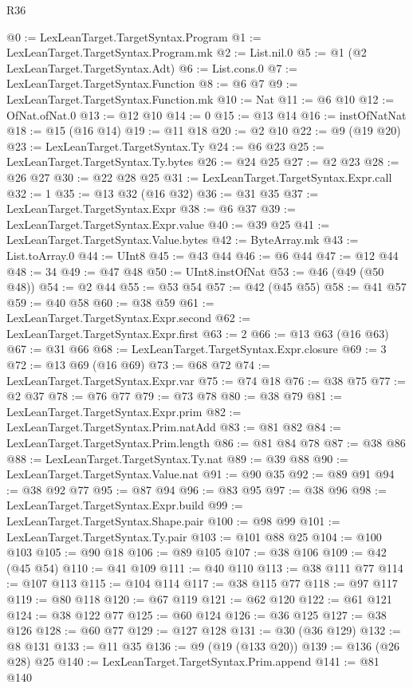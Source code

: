 \begin{lexlean}{R36}
\begin{coremodule}
@0 := LexLeanTarget.TargetSyntax.Program
@1 := LexLeanTarget.TargetSyntax.Program.mk
@2 := List.nil.{0}
@5 := @1 (@2 LexLeanTarget.TargetSyntax.Adt)
@6 := List.cons.{0}
@7 := LexLeanTarget.TargetSyntax.Function
@8 := @6 @7
@9 := LexLeanTarget.TargetSyntax.Function.mk
@10 := Nat
@11 := @6 @10
@12 := OfNat.ofNat.{0}
@13 := @12 @10
@14 := 0
@15 := @13 @14
@16 := instOfNatNat
@18 := @15 (@16 @14)
@19 := @11 @18
@20 := @2 @10
@22 := @9 (@19 @20)
@23 := LexLeanTarget.TargetSyntax.Ty
@24 := @6 @23
@25 := LexLeanTarget.TargetSyntax.Ty.bytes
@26 := @24 @25
@27 := @2 @23
@28 := @26 @27
@30 := @22 @28 @25
@31 := LexLeanTarget.TargetSyntax.Expr.call
@32 := 1
@35 := @13 @32 (@16 @32)
@36 := @31 @35
@37 := LexLeanTarget.TargetSyntax.Expr
@38 := @6 @37
@39 := LexLeanTarget.TargetSyntax.Expr.value
@40 := @39 @25
@41 := LexLeanTarget.TargetSyntax.Value.bytes
@42 := ByteArray.mk
@43 := List.toArray.{0}
@44 := UInt8
@45 := @43 @44
@46 := @6 @44
@47 := @12 @44
@48 := 34
@49 := @47 @48
@50 := UInt8.instOfNat
@53 := @46 (@49 (@50 @48))
@54 := @2 @44
@55 := @53 @54
@57 := @42 (@45 @55)
@58 := @41 @57
@59 := @40 @58
@60 := @38 @59
@61 := LexLeanTarget.TargetSyntax.Expr.second
@62 := LexLeanTarget.TargetSyntax.Expr.first
@63 := 2
@66 := @13 @63 (@16 @63)
@67 := @31 @66
@68 := LexLeanTarget.TargetSyntax.Expr.closure
@69 := 3
@72 := @13 @69 (@16 @69)
@73 := @68 @72
@74 := LexLeanTarget.TargetSyntax.Expr.var
@75 := @74 @18
@76 := @38 @75
@77 := @2 @37
@78 := @76 @77
@79 := @73 @78
@80 := @38 @79
@81 := LexLeanTarget.TargetSyntax.Expr.prim
@82 := LexLeanTarget.TargetSyntax.Prim.natAdd
@83 := @81 @82
@84 := LexLeanTarget.TargetSyntax.Prim.length
@86 := @81 @84 @78
@87 := @38 @86
@88 := LexLeanTarget.TargetSyntax.Ty.nat
@89 := @39 @88
@90 := LexLeanTarget.TargetSyntax.Value.nat
@91 := @90 @35
@92 := @89 @91
@94 := @38 @92 @77
@95 := @87 @94
@96 := @83 @95
@97 := @38 @96
@98 := LexLeanTarget.TargetSyntax.Expr.build
@99 := LexLeanTarget.TargetSyntax.Shape.pair
@100 := @98 @99
@101 := LexLeanTarget.TargetSyntax.Ty.pair
@103 := @101 @88 @25
@104 := @100 @103
@105 := @90 @18
@106 := @89 @105
@107 := @38 @106
@109 := @42 (@45 @54)
@110 := @41 @109
@111 := @40 @110
@113 := @38 @111 @77
@114 := @107 @113
@115 := @104 @114
@117 := @38 @115 @77
@118 := @97 @117
@119 := @80 @118
@120 := @67 @119
@121 := @62 @120
@122 := @61 @121
@124 := @38 @122 @77
@125 := @60 @124
@126 := @36 @125
@127 := @38 @126
@128 := @60 @77
@129 := @127 @128
@131 := @30 (@36 @129)
@132 := @8 @131
@133 := @11 @35
@136 := @9 (@19 (@133 @20))
@139 := @136 (@26 @28) @25
@140 := LexLeanTarget.TargetSyntax.Prim.append
@141 := @81 @140

\end{coremodule}
\end{lexlean}
